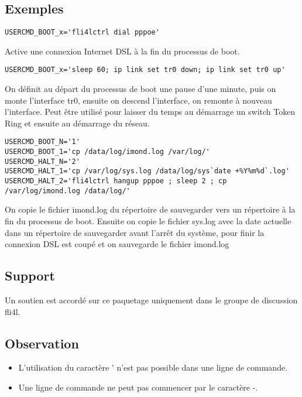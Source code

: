 \subsection{Exemples}

\begin{verbatim}
USERCMD_BOOT_x='fli4lctrl dial pppoe'
\end{verbatim}

Active une connexion Internet DSL à la fin du processus de boot. 

\begin{verbatim}
USERCMD_BOOT_x='sleep 60; ip link set tr0 down; ip link set tr0 up'
\end{verbatim}

On définit au départ du processus de boot une pause d'une minute, puis on monte
l'interface tr0, ensuite on descend l'interface, on remonte à nouveau l'interface.
Peut être utilisé pour laisser du temps au démarrage un switch Token Ring et
ensuite au démarrage du réseau.

\begin{verbatim}
USERCMD_BOOT_N='1'
USERCMD_BOOT_1='cp /data/log/imond.log /var/log/'
USERCMD_HALT_N='2'
USERCMD_HALT_1='cp /var/log/sys.log /data/log/sys`date +%Y%m%d`.log'
USERCMD_HALT_2='fli4lctrl hangup pppoe ; sleep 2 ; cp /var/log/imond.log /data/log/'
\end{verbatim}

On copie le fichier imond.log du répertoire de sauvegarder vers un répertoire à
la fin du processus de boot. Ensuite on copie le fichier sys.log avec la date
actuelle dans un répertoire de sauvegarder avant l'arrêt du système, pour
finir la connexion DSL est coupé et on sauvegarde le fichier imond.log

\subsection{Support}

Un soutien est accordé sur ce paquetage uniquement dans le groupe
de discussion fli4l.

\subsection{Observation}

\begin{itemize}
    \item L'utilisation du caractère \flqq{}'\frqq{} n'est pas possible dans
      une ligne de commande.
    \item Une ligne de commande ne peut pas commencer par le caractère \flqq{}-\frqq{}.
\end{itemize}


